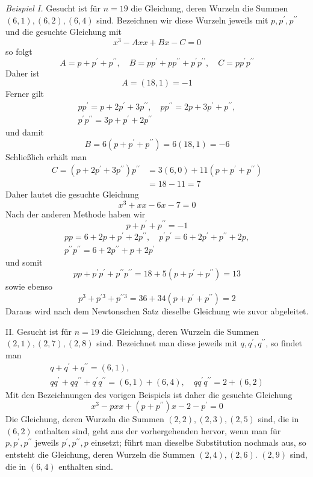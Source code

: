 \textit{Beispiel I.} Gesucht ist für \(n=19\) die Gleichung, deren Wurzeln die Summen \((6,1),\allowbreak (6,2),\allowbreak (6,4)\) sind. Bezeichnen wir diese Wurzeln jeweils mit \(p,\allowbreak p^{\prime},\allowbreak p^{\prime\prime}\) und die gesuchte Gleichung mit \[x^3-Axx+Bx-C=0\] so folgt \[A=p+p^{\prime}+p^{\prime\prime},\quad B=pp^{\prime}+pp^{\prime\prime}+p^{\prime}p^{\prime\prime},\quad C=pp^{\prime}p^{\prime\prime}\] Daher ist \[A=(18,1)=-1\] Ferner gilt
\[\begin{gathered}
pp^{\prime}=p+2p^{\prime}+3p^{\prime\prime},\quad pp^{\prime\prime}=2p+3p^{\prime}+p^{\prime\prime},\\
p^{\prime}p^{\prime\prime}=3p+p^{\prime}+2p^{\prime\prime}
\end{gathered}\] und damit \[B=6(p+p^{\prime}+p^{\prime\prime})=6(18,1)=-6\] Schließlich erhält man \[\begin{aligned}
C=(p+2p^{\prime}+3p^{\prime\prime})p^{\prime\prime}&=3(6,0)+11(p+p^{\prime}+p^{\prime\prime})\\
&=18-11=7
\end{aligned}\] Daher lautet die gesuchte Gleichung \[x^3+xx-6x-7=0\] Nach der anderen Methode haben wir \[p+p^{\prime}+p^{\prime\prime}=-1\] \[\begin{gathered}
pp=6+2p+p^{\prime}+2p^{\prime\prime},\quad p^{\prime}p^{\prime}=6+2p^{\prime}+p^{\prime\prime}+2p,\\
p^{\prime\prime}p^{\prime\prime}=6+2p^{\prime\prime}+p+2p^{\prime}
\end{gathered}\] und somit \[pp+p^{\prime}p^{\prime}+p^{\prime\prime}p^{\prime\prime}=18+5(p+p^{\prime}+p^{\prime\prime})=13\] sowie ebenso \[p^3+p^{\prime3}+p^{\prime\prime3}=36+34(p+p^{\prime}+p^{\prime\prime})=2\] Daraus wird nach dem Newtonschen Satz dieselbe Gleichung wie zuvor abgeleitet.

II. Gesucht ist für \(n=19\) die Gleichung, deren Wurzeln die Summen \((2,1),\allowbreak (2,7),\allowbreak (2,8)\) sind. Bezeichnet man diese jeweils mit \(q,\allowbreak q^{\prime},\allowbreak q^{\prime\prime}\), so findet man \[\begin{gathered}
q+q^{\prime}+q^{\prime\prime}=(6,1),\\
qq^{\prime}+qq^{\prime\prime}+q^{\prime}q^{\prime\prime}=(6,1)+(6,4),\quad qq^{\prime}q^{\prime\prime}=2+(6,2)
\end{gathered}\] Mit den Bezeichnungen des vorigen Beispiels ist daher die gesuchte Gleichung \[x^3-pxx+(p+p^{\prime\prime})x-2-p^{\prime}=0\] Die Gleichung, deren Wurzeln die Summen \((2,2),\allowbreak (2,3),\allowbreak (2,5)\) sind, die in \((6,2)\) enthalten sind, geht aus der vorhergehenden hervor, wenn man für \(p,\allowbreak p^{\prime},\allowbreak p^{\prime\prime}\) jeweils \(p^{\prime},\allowbreak p^{\prime\prime},\allowbreak p\) einsetzt; führt man dieselbe Substitution nochmals aus, so entsteht die Gleichung, deren Wurzeln die Summen \((2,4),\allowbreak (2,6)\). \((2,9)\) sind, die in \((6,4)\) enthalten sind.

